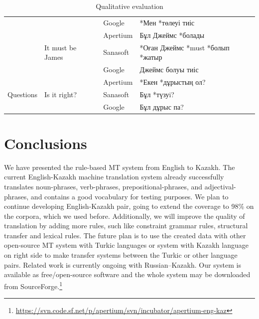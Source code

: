 \documentclass[11pt]{article}
\begin{document}
\begin{table}
\begin{tabular}{|l|l|l|l|}
                                  &                                         & Google   & *Мен *төлеуі тиіс \\ %
                                  & \multirow{3}{*}{It must be James}       & Apertium & Бұл Джеймс *болады \\ %
                                  &                                         & Sanasoft & *Оған Джеймс *must *болып *жатыр  \\ %
                                  &                                         & Google   & Джеймс болуы тиіс \\ %
    \hline 
    \multirow{3}{*}{Questions}    & \multirow{3}{*}{Is it right?}           & Apertium & *Екен *дұрыстың ол? \\ %
                                  &                                         & Sanasoft & Бұл *түзуi? \\ %
                                  &                                         & Google   & Бұл дұрыс па? \\
    \hline 
  \end{tabular}

  \caption{Qualitative evaluation}
  \label{table:qualeval}
\end{table}

\section{Conclusions}

We have presented the rule-based MT system from English to Kazakh. The current English-Kazakh machine translation 
system already successfully translates noun-phrases, verb-phrases, prepositional-phrases, and adjectival-phrases, and 
contains a good vocabulary for testing purposes. 
We plan to continue developing English-Kazakh pair, going to extend the coverage to 98\% on the corpora, 
which we used before. Additionally, we will improve the quality of translation by adding more rules, such like 
constraint grammar rules, structural transfer and lexical rules. The future plan is to use the created data with other 
open-source MT system with Turkic languages or system with Kazakh language on right side to make transfer systems 
between the Turkic or other language pairs. Related work is currently ongoing with Russian--Kazakh. 
Our system is available as free/open-source software and the whole system may be downloaded 
from SourceForge.\footnote{\url{https://svn.code.sf.net/p/apertium/svn/incubator/apertium-eng-kaz}}
\end{document}
